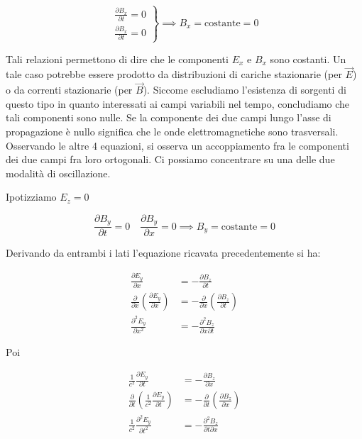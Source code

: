 \[
	\left. \begin{array}{r}
	 	\frac{\partial B_x}{\partial t} = 0 \\
		\frac{\partial B_x}{\partial t} = 0
	\end{array} \right\} \implies B_x = \text{costante} = 0
\]

Tali relazioni permettono di dire che le componenti $ E_x $ e $ B_x $ sono costanti. Un tale caso potrebbe essere prodotto da distribuzioni di cariche stazionarie (per $ \vec{E}  $) o da correnti stazionarie (per $ \vec{B}  $). Siccome escludiamo l'esistenza di sorgenti di questo tipo in quanto interessati ai campi variabili nel tempo, concludiamo che tali componenti sono nulle. Se la componente dei due campi lungo l'asse di propagazione è nullo significa che le onde elettromagnetiche sono trasversali. Osservando le altre 4 equazioni, si osserva un accoppiamento fra le componenti dei due campi fra loro ortogonali. Ci possiamo concentrare su una delle due modalità di oscillazione.

Ipotizziamo $ E_z = 0 $

\[
	\frac{\partial B_y}{\partial t} = 0 \quad \frac{\partial B_y}{\partial x} = 0 \implies B_y = \text{costante} = 0
\]

Derivando da entrambi i lati l'equazione ricavata precedentemente si ha:

\begin{equation*}
	\begin{aligned}
		\frac{\partial E_y}{\partial x} &= - \frac{\partial B_z}{\partial t} \\
		\frac{\partial}{\partial x} \left( \frac{\partial E_y}{\partial x}  \right) &= - \frac{\partial}{\partial x} \left( \frac{\partial B_z}{\partial t}  \right) \\
		\frac{\partial^2 E_y}{\partial x^2} &= - \frac{\partial^2 B_z}{\partial x \partial t}
	\end{aligned}
\end{equation*}

Poi

\begin{equation*}
	\begin{aligned}
		\frac{1}{c^2} \frac{\partial E_y}{\partial t} &= - \frac{\partial B_z}{\partial x} \\
		\frac{\partial}{\partial t} \left( \frac{1}{c^2} \frac{\partial E_y}{\partial t} \right) &= - \frac{\partial}{\partial t} \left( \frac{\partial B_z}{\partial x} \right) \\
		\frac{1}{c^2} \frac{\partial^2 E_y}{\partial t^2} &= - \frac{\partial^2 B_z}{\partial t\partial x}
	\end{aligned}
\end{equation*}

